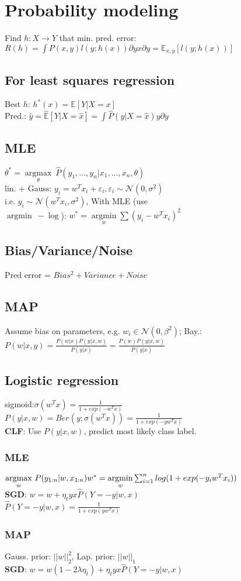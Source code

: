 \section*{Probability modeling}
Find $h:X\rightarrow Y$ that min. pred. error: 
$R(h) = \int P(x,y)l(y;h(x)) \partial yx \partial y = \mathbb{E}_{x,y}[l(y;h(x))]$

\subsection*{For least squares regression}
Best $h$: $h^*(x) = \mathbb{E}[Y|X=x]$ \\
Pred.: $\hat{y} = \hat{\mathbb{E}}[Y|X=\hat{x}] = \int \hat{P}(y|X=\hat{x}) y \partial y$

\subsection*{MLE}
$\theta^* = \underset{\theta}{\operatorname{argmax}} ~ \hat{P}(y_1,...,y_n|x_1,...,x_n,\theta)$\\
lin. + Gauss: $y_i = w^T x_i + \varepsilon_i, \varepsilon_i \sim \mathcal{N}(0, \sigma^2)$\\
i.e. $y_i \sim \mathcal{N}(w^T x_i, \sigma^2)$, With MLE (use\\ $\operatorname{argmin} ~ - \operatorname{log}$): $w^* = \underset{w}{\operatorname{argmin}} \sum (y_i-w^Tx_i)^2$

\subsection*{Bias/Variance/Noise}
Pred error = $Bias^2 + Variance + Noise$

\subsection*{MAP}
Assume bias on parameters, e.g. $w_i \in \mathcal{N}(0, \beta^2)$;
Bay.: $P(w|x,y) = \frac{P(w|x) P(y|x,w)}{P(y|x)} = \frac{P(w) P(y|x,w)}{P(y|x)}$
\subsection*{Logistic regression}
sigmoid:$\sigma(w^Tx) = \frac{1}{1+exp(-w^Tx)}$\\
$P(y|x,w) = Ber(y; \sigma(w^Tx)) = \frac{1}{1+exp(-y w^T x)}$\\
\textbf{CLF}: Use $P(y|x,w)$, predict most likely class label.
\subsubsection*{MLE}
$\underset{w}{\operatorname{argmax}} ~ P(y_{1:n}|w,x_{1:n})\\
w^* = \underset{w}{\operatorname{argmin}} \sum_{i=1}^n log(1+exp(-y_i w^T x_i))$\\
\textbf{SGD}: $w = w + \eta_t y x \hat{P}(Y = -y|w,x)$\\
$\hat{P}(Y = -y|w,x) = \frac{1}{1+exp(yw^Tx)}$
\subsubsection*{MAP} Gauss. prior: $||w||_2^2$, Lap. prior: $||w||_1$\\
\textbf{SGD}: $w = w (1-2\lambda \eta_t) + \eta_t y x \hat{P}(Y = -y|w,x)$